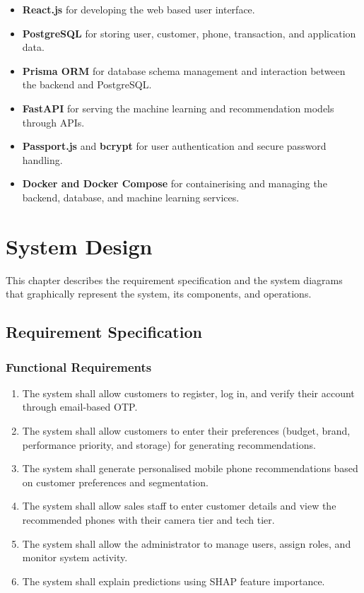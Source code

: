 \documentclass[12pt]{report}
\numberwithin{figure}{chapter}
\numberwithin{table}{chapter}
\numberwithin{equation}{chapter}
\begin{document}
\begin{itemize}
    \item \textbf{React.js} for developing the web based user interface.
    
    \item \textbf{PostgreSQL} for storing user, customer, phone, transaction, and application data.
    
    \item \textbf{Prisma ORM} for database schema management and interaction between the backend and PostgreSQL.
    
    \item \textbf{FastAPI} for serving the machine learning and recommendation models through APIs.
    
    \item \textbf{Passport.js} and \textbf{bcrypt} for user authentication and secure password handling.
    
    \item \textbf{Docker and Docker Compose} for containerising and managing the backend, database, and machine learning services.
\end{itemize}


\chapter{System Design}
This chapter describes the requirement specification and the system diagrams that graphically represent the system, its components, and operations.

\section{Requirement Specification}

\subsection{Functional Requirements}

\begin{enumerate}
    \item The system shall allow customers to register, log in, and verify their account through email-based OTP.
    \item The system shall allow customers to enter their preferences (budget, brand, performance priority, and storage) for generating recommendations.
    \item The system shall generate personalised mobile phone recommendations based on customer preferences and segmentation.
    \item The system shall allow sales staff to enter customer details and view the recommended phones with their camera tier and tech tier.
    \item The system shall allow the administrator to manage users, assign roles, and monitor system activity.
    \item The system shall explain predictions using SHAP feature importance.
\end{enumerate}
\end{document}
